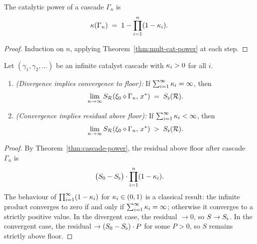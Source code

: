\begin{theorem}\label{thm:cascade-power}
The catalytic power of a cascade $\Gamma_n$ is
\[
\kappa(\Gamma_n) \;=\; 1 - \prod_{i=1}^{n} (1 - \kappa_i).
\]
\end{theorem}

\begin{proof}
Induction on $n$, applying Theorem~\ref{thm:mult-cat-power} at each step.
\end{proof}

\begin{theorem}\label{thm:borel-cantelli}
Let $(\gamma_1, \gamma_2, \ldots)$ be an infinite catalyst cascade with $\kappa_i > 0$ for all $i$.
\begin{enumerate}[nosep, label=(\roman*)]
  \item \emph{(Divergence implies convergence to floor):} If $\sum_{i=1}^{\infty} \kappa_i = \infty$, then
        \[
        \lim_{n \to \infty} S_{\mathcal{R}}(\xi_0 \diamond \Gamma_n,\, x^*) \;=\; S_{\flat}(\mathcal{R}).
        \]
  \item \emph{(Convergence implies residual above floor):} If $\sum_{i=1}^{\infty} \kappa_i < \infty$, then
        \[
        \lim_{n \to \infty} S_{\mathcal{R}}(\xi_0 \diamond \Gamma_n,\, x^*) \;>\; S_{\flat}(\mathcal{R}).
        \]
\end{enumerate}
\end{theorem}

\begin{proof}
By Theorem~\ref{thm:cascade-power}, the residual above floor after cascade $\Gamma_n$ is
\[
\bigl(S_0 - S_{\flat}\bigr) \cdot \prod_{i=1}^{n}(1 - \kappa_i).
\]
The behaviour of $\prod_{i=1}^{\infty}(1 - \kappa_i)$ for $\kappa_i \in (0,1)$ is a classical result: the infinite product converges to zero if and only if $\sum_{i=1}^{\infty} \kappa_i = \infty$; otherwise it converges to a strictly positive value. In the divergent case, the residual $\to 0$, so $S \to S_{\flat}$. In the convergent case, the residual $\to (S_0 - S_{\flat}) \cdot P$ for some $P > 0$, so $S$ remains strictly above floor.
\end{proof}

